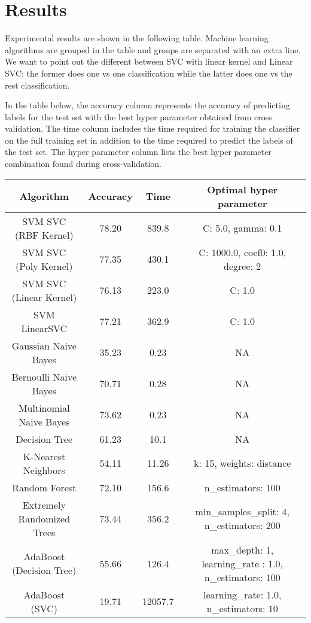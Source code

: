 \section{Results}

Experimental results are shown in the following table. Machine
learning algorithms are grouped in the table and groups are separated
with an extra line. We want to point out the different between SVC
with linear kernel and Linear SVC: the former does one vs one
classification while the latter does one vs the rest classification. 

In the table below, the accuracy column represents the accuracy of
predicting labels for the test set with the best hyper parameter
obtained from cross validation. The time column includes the time
required for training the classifier on the full training set in
addition to the time required to predict the labels of the test
set. The hyper parameter column lists the best hyper parameter
combination found during cross-validation. 

\begin{table}
\begin{center}
	\begin{tabular}{c|c|c|c}
    \hline
	     Algorithm   & Accuracy & Time & Optimal hyper parameter\\
         \hline
         SVM SVC (RBF Kernel)   & 78.20  & 839.8 & C: 5.0, gamma: 0.1\\
         \hline
         SVM SVC (Poly Kernel)  & 77.35  & 430.1 & C: 1000.0, coef0: 1.0, degree: 2\\
         \hline
         SVM SVC (Linear Kernel)   &  76.13  & 223.0 & C: 1.0\\
         \hline
         SVM LinearSVC    &  77.21   &362.9  & C: 1.0\\
         \hline
         \hline
         Gaussian Naive Bayes & 35.23 & 0.23 & NA \\
         \hline
         Bernoulli Naive Bayes &   70.71    & 0.28  & NA \\
         \hline
         Multinomial Naive Bayes & 73.62 	& 0.23  & NA \\
         \hline
         \hline
         Decision Tree &  61.23 & 10.1 & NA \\
         \hline
         \hline
         K-Nearest Neighbors & 54.11 & 11.26 & k: 15, weights:  distance\\
         \hline
         \hline
         Random Forest & 72.10 & 156.6 & n\_estimators: 100\\
         \hline
         Extremely Randomized Trees & 73.44 & 356.2 &
         min\_samples\_split: 4,
         n\_estimators: 200 \\
         \hline
         AdaBoost (Decision Tree) & 55.66 & 126.4 & max\_depth: 1, learning\_rate : 1.0, n\_estimators: 100\\
         \hline
         AdaBoost (SVC) & 19.71 & 12057.7 & learning\_rate: 1.0,
         n\_estimators: 10\\
         \hline
          \end{tabular}
\end{center}
\end{table}
